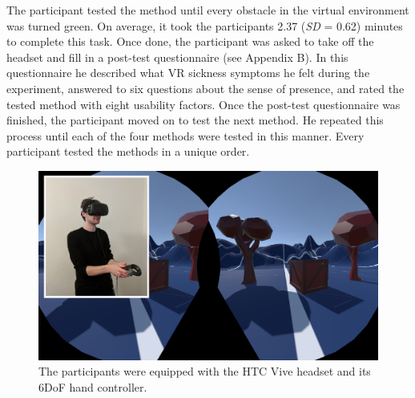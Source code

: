 The participant tested the method until every obstacle in the virtual environment was turned green. On average, it took the participants 2.37 (\textit{SD} = 0.62) minutes to complete this task. Once done, the participant was asked to take off the headset and fill in a post-test questionnaire (see Appendix B). In this questionnaire he described what VR sickness symptoms he felt during the experiment, answered to six questions about the sense of presence, and rated the tested method with eight usability factors. Once the post-test questionnaire was finished, the participant moved on to test the next method. He repeated this process until each of the four methods were tested in this manner. Every participant tested the methods in a unique order.

\begin{figure}[th]
\centering
\includegraphics[width=1\textwidth]{img/equipment.png}
\caption{The participants were equipped with the HTC Vive headset and its 6DoF hand controller.}
\label{fig:equipment}
\end{figure}